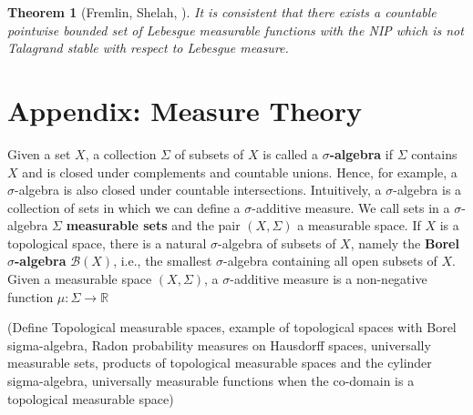 \documentclass[psamsfonts]{amsart}
\newtheorem{thm}{Theorem}[section]
\theoremstyle{definition}
\theoremstyle{remark}
\numberwithin{equation}{section}
\begin{document}
\begin{thm}[Fremlin, Shelah, \cite{fremlin1993pointwise}]
    It is consistent that there exists a countable pointwise bounded set of Lebesgue measurable functions with the NIP which is not Talagrand stable with respect to Lebesgue measure.
\end{thm}

\section*{Appendix: Measure Theory}

Given a set $X$, a collection $\Sigma$ of subsets of $X$ is called a \textbf{$\sigma$-algebra} if $\Sigma$ contains $X$ and is closed under complements and countable unions. Hence, for example, a $\sigma$-algebra is also closed under countable intersections. Intuitively, a $\sigma$-algebra is a collection of sets in which we can define a $\sigma$-additive measure. We call sets in a $\sigma$-algebra $\Sigma$ \textbf{measurable sets} and the pair $(X,\Sigma)$ a measurable space. If $X$ is a topological space, there is a natural $\sigma$-algebra of subsets of $X$, namely the \textbf{Borel $\sigma$-algebra} $\mathcal{B}(X)$, i.e., the smallest $\sigma$-algebra containing all open subsets of $X$. Given a measurable space $(X,\Sigma)$, a $\sigma$-additive measure is a non-negative function $\mu:\Sigma\rightarrow\mathbb{R}$

(Define Topological measurable spaces, example of topological spaces with Borel sigma-algebra, Radon probability measures on Hausdorff spaces, universally measurable sets, products of topological measurable spaces and the cylinder sigma-algebra, universally measurable functions when the co-domain is a topological measurable space)



\end{document}
